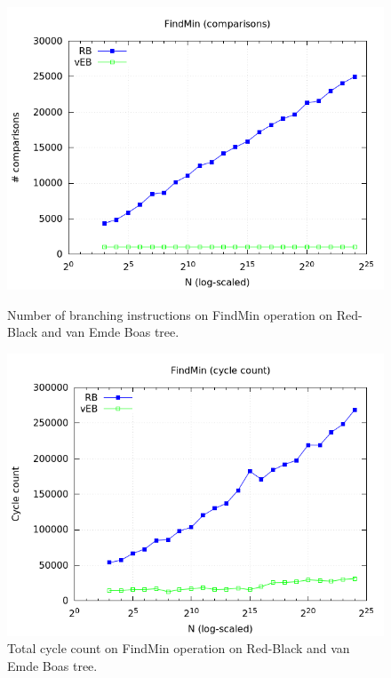\documentclass[a4paper,oneside,article,11pt]{memoir}
\begin{document}
\begin{figure}[H]
\centering
\begin{minipage}{0.48\columnwidth}
  \centering
  \includegraphics[width=\linewidth]{../res/rbveb/rbveb_findmin_br.png}%
  \caption{Number of branching instructions on FindMin operation on Red-Black and van Emde Boas tree.}
  \label{fig:rbveb_findmin_br.png}
\end{minipage}%
\hfill
\begin{minipage}{0.48\columnwidth}
  \centering
  \includegraphics[width=\linewidth]{../res/rbveb/rbveb_findmin_cyc.png}%
  \caption{Total cycle count on FindMin operation on Red-Black and van Emde Boas tree.}
  \label{fig:rbveb_mq_pow2_logscale_y_rt}
\end{minipage}
\end{figure}
\end{document}
